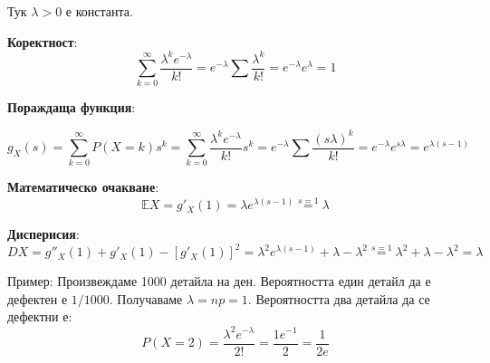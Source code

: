 \documentclass{article}
\renewcommand{\\}{\newline}
\begin{document}
Тук \(\lambda > 0\) е константа. 

\textbf{Коректност}: \[
  \sum_{k=0}^{\infty}\frac{\lambda^{k}e^{-\lambda}}{k!} = e^{-\lambda}\sum \frac{\lambda^{k}}{k!} = e^{-\lambda}e^{\lambda} = 1
\] 

\textbf{Пораждаща функция}: 

\[
  g_{X}(s) = \sum_{k=0}^{\infty}P(X=k)s^{k} = \sum_{k=0}^{\infty}\frac{\lambda^{k}e^{-\lambda}}{k!}s^{k} = e^{-\lambda}\sum\frac{(s\lambda)^{k}}{k!} = e^{-\lambda}e^{s\lambda} = e^{\lambda(s-1)}
\] 

\textbf{Математическо очакване}: \[
  \mathbb{E}X = g'_{X}(1) = \lambda e^{\lambda(s-1)} \overset{s=1}{=}\lambda
\] 

\textbf{Дисперисия}: 
\[
  DX = g''_{X}(1) + g'_{X}(1) - [g'_{X}(1)]^{2} = \lambda^{2}e^{\lambda(s-1)} + \lambda - \lambda^{2} \overset{s=1}{=} \lambda^{2} + \lambda - \lambda^{2} = \lambda 
\] 

Пример: Произвеждаме 1000 детайла на ден. Вероятността един детайл да е дефектен е \(1/1000\). Получаваме \(\lambda = np = 1\). Вероятността два детайла да се дефектни е: \[
  P(X=2) = \frac{\lambda^{2}e^{-\lambda}}{2!} = \frac{1e^{-1}}{2} = \frac{1}{2e}
\]    
\end{document}

